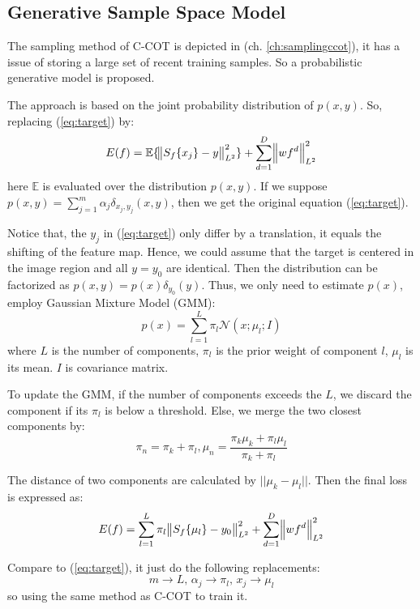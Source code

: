 \documentclass[12pt]{article}
\numberwithin{equation}{section}
\begin{document}
{\subsection{Generative Sample Space Model}
The sampling method of C-COT is depicted in (ch. \ref{ch:samplingccot}), it has a issue of storing a large set of recent training samples. So a probabilistic generative model is proposed. \par
The approach is based on the joint probability distribution of $p(x,y)$. So, replacing (\ref{eq:target}) by:
\begin{equation} 
	E(f)=\mathbb{E} \{\norm{S_f\{x_j\}-y}^2_{L^2} \}+ \sum^D_{d=1} \norm{w f^d}^2_{L^2} 
\end{equation}
here $\mathbb{E}$ is evaluated over the distribution $p(x,y)$. If we suppose $p(x,y)=\sum^m_{j=1}\alpha_j\delta_{x_j,y_j}(x,y)$, then we get the original equation (\ref{eq:target}). \par
Notice that, the $y_j$ in (\ref{eq:target}) only differ by a translation, it equals the shifting of the feature map. Hence, we could assume that the target is centered in the image region and all $y=y_0$ are identical. Then the distribution can be factorized as $p(x,y)=p(x)\delta_{y_0}(y)$. Thus, we only need to estimate $p(x)$, employ Gaussian Mixture Model (GMM):
\begin{equation}
	p(x)=\sum^L_{l=1} \pi_l \mathcal{N} (x;\mu_l;I)
\end{equation}
where $L$ is the number of components, $\pi_l$ is the prior weight of component $l$, $\mu_l$ is its mean. $I$ is covariance matrix. \par
To update the GMM, if the number of components exceeds the $L$, we discard the component if its $\pi_l$ is below a threshold. Else, we merge the two closest components by:
\begin{equation} 
	\pi_n = \pi_k + \pi_l , \mu_n = \frac{\pi_k\mu_k+\pi_l\mu_l}{\pi_k+\pi_l}
\end{equation} \par
The distance of two components are calculated by $||\mu_k - \mu_l||$. Then the final loss is expressed as:
\begin{equation} 
	E(f)=\sum^L_{l=1} \pi_l \norm{S_f\{\mu_l\}-y_0}^2_{L^2} + \sum^D_{d=1} \norm{w f^d}^2_{L^2} 
\end{equation} \par
Compare to (\ref{eq:target}), it just do the following replacements:
\begin{equation} 
	m \rightarrow L \text{, } \alpha_j \rightarrow \pi_l \text{, } x_j \rightarrow \mu_l 
\end{equation}
so using the same method as C-COT to train it.
}
\end{document}

